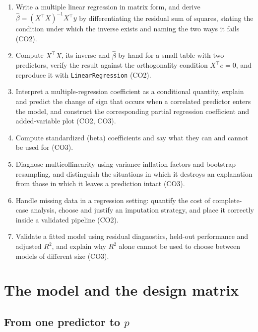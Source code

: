 \documentclass[11pt]{article}
\newcommand{\Xt}{X^{\!\top}}
\begin{document}
\begin{enumerate}[leftmargin=*]
  \item Write a multiple linear regression in matrix form, and derive
    $\hat\beta = (\Xt X)^{-1}\Xt y$ by differentiating the residual sum of
    squares, stating the condition under which the inverse exists and naming
    the two ways it fails (CO2).
  \item Compute $\Xt X$, its inverse and $\hat\beta$ by hand for a small
    table with two predictors, verify the result against the orthogonality
    condition $\Xt e = 0$, and reproduce it with
    \texttt{LinearRegression} (CO2).
  \item Interpret a multiple-regression coefficient as a conditional
    quantity, explain and predict the change of sign that occurs when a
    correlated predictor enters the model, and construct the corresponding
    partial regression coefficient and added-variable plot (CO2, CO3).
  \item Compute standardized (beta) coefficients and say what they can and
    cannot be used for (CO3).
  \item Diagnose multicollinearity using variance inflation factors and
    bootstrap resampling, and distinguish the situations in which it destroys
    an explanation from those in which it leaves a prediction intact
    (CO3).
  \item Handle missing data in a regression setting: quantify the cost of
    complete-case analysis, choose and justify an imputation strategy, and
    place it correctly inside a validated pipeline (CO2).
  \item Validate a fitted model using residual diagnostics, held-out
    performance and adjusted $R^2$, and explain why $R^2$ alone cannot be
    used to choose between models of different size (CO3).
\end{enumerate}

\section{The model and the design matrix}
\label{sec:model}

\subsection{\texorpdfstring{From one predictor to $p$}{From one predictor to p}}
\end{document}
